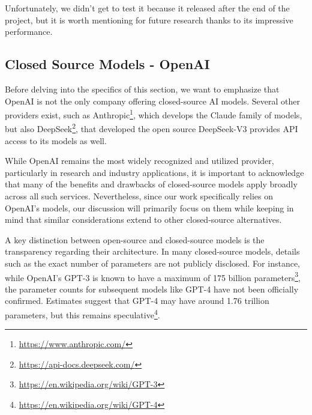 Unfortunately, we didn't get to test it because it released after the end of the
project, but it is worth mentioning for future research thanks to its impressive
performance.

\subsection{Closed Source Models - OpenAI}
\label{sub:closed_source_models_openai}

Before delving into the specifics of this section, we want to emphasize that OpenAI
is not the only company offering closed-source AI models. Several other
providers exist, such as Anthropic\footnote{\url{https://www.anthropic.com/}}, which
develops the Claude family of models, but also DeepSeek\footnote{\url{https://api-docs.deepseek.com/}},
that developed the open source DeepSeek-V3 provides API access to its models as
well.

While OpenAI remains the most widely recognized and utilized provider, particularly
in research and industry applications, it is important to acknowledge that many
of the benefits and drawbacks of closed-source models apply broadly across all
such services. Nevertheless, since our work specifically relies on OpenAI's
models, our discussion will primarily focus on them while keeping in mind that similar
considerations extend to other closed-source alternatives.

\vspace{1mm}

A key distinction between open-source and closed-source models is the
transparency regarding their architecture. In many closed-source models, details
such as the exact number of parameters are not publicly disclosed. For instance,
while OpenAI's GPT-3\cite{brown2020languagemodelsfewshotlearners} is known to have
a maximum of 175 billion parameters\footnote{\url{https://en.wikipedia.org/wiki/GPT-3}},
the parameter counts for subsequent models like GPT-4\cite{openai2024gpt4technicalreport}
have not been officially confirmed. Estimates suggest that GPT-4 may have around
1.76 trillion parameters, but this remains speculative\footnote{\url{https://en.wikipedia.org/wiki/GPT-4}}.

